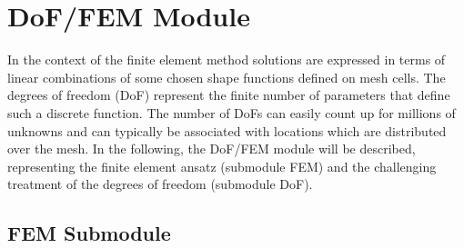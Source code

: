 
\section{DoF/FEM Module}
\label{sec:dof_module}

In the context of the finite element method solutions are expressed in terms of linear
combinations of some chosen shape functions defined on mesh cells. 
The degrees of freedom (DoF) represent the finite
number of parameters that define such a discrete function. The number
of DoFs can easily count up for millions of unknowns and can typically
be associated with locations which are distributed over the mesh.
In the following, the DoF/FEM module will be 
described, representing the finite element ansatz (submodule FEM) 
and the challenging treatment of the degrees of freedom (submodule DoF).

\subsection{FEM Submodule}


